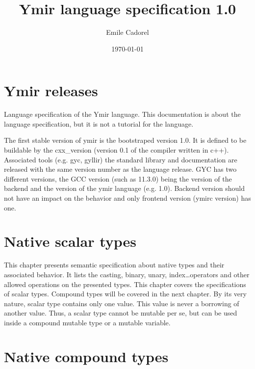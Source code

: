 \documentclass[a4paper,11pt]{book}
\author{Emile Cadorel}
\date{\today}
\title{Ymir language specification 1.0}
\begin{document}

\maketitle
\dominitoc
\dominilof
\dominilot

\chapter*{Ymir releases}

Language specification of the Ymir language. This documentation is about the
language specification, but it is not a tutorial for the language.

The first stable version of ymir is the bootstraped version 1.0. It is defined to be buildable by the cxx\_version (version 0.1 of the compiler written in c++). Associated tools (e.g. gyc, gyllir) the standard library and documentation are released with the same version number as the language release. GYC has two different versions, the GCC version (such as 11.3.0) being the version of the backend and the version of the ymir language (e.g. 1.0). Backend version should not have an impact on the behavior and only frontend version (ymirc version) has one.

\begin{multicols}{2}
  \tableofcontents
\end{multicols}


\chapter{Native scalar types}

This chapter presents semantic specification about native types and their
associated behavior. It lists the casting, binary, unary, index\ldots operators
and other allowed operations on the presented types. This chapter covers the
specifications of scalar types. Compound types will be covered in the next
chapter. By its very nature, scalar type contains only one value. This value is
never a borrowing of another value. Thus, a scalar type cannot be mutable per
se, but can be used inside a compound mutable type or a mutable variable.

\begin{multicols}{2}
  \minitoc%
  
\end{multicols}

\chapter{Native compound types}
\end{document}
